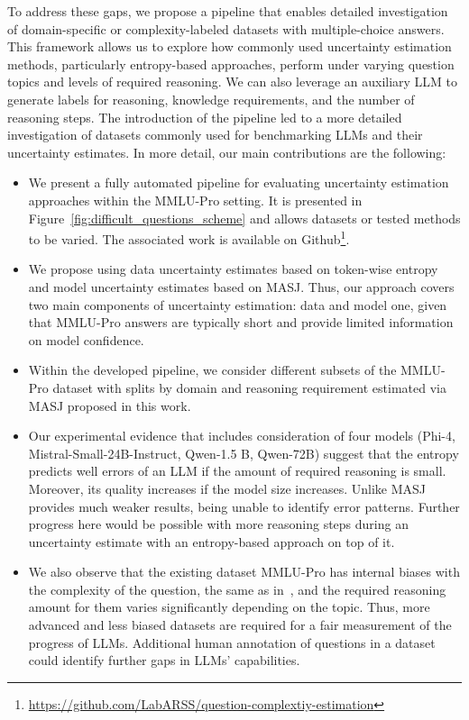 To address these gaps, we propose a pipeline that enables detailed investigation of domain-specific or complexity-labeled datasets with multiple-choice answers. 
This framework allows us to explore how commonly used uncertainty estimation methods, particularly entropy-based approaches, perform under varying question topics and levels of required reasoning. 
We can also leverage an auxiliary LLM to generate labels for reasoning, knowledge requirements, and the number of reasoning steps. 
The introduction of the pipeline led to a more detailed investigation of datasets commonly used for benchmarking LLMs and their uncertainty estimates.
In more detail, our main contributions are the following:
\begin{itemize}
    \item We present a fully automated pipeline for evaluating uncertainty estimation approaches within the MMLU-Pro setting. It is presented in Figure~\ref{fig:difficult_questions_scheme} and allows datasets or tested methods to be varied. The associated work is available on Github\footnote{\url{https://github.com/LabARSS/question-complextiy-estimation}}.
    \item We propose using data uncertainty estimates based on token-wise entropy and model uncertainty estimates based on MASJ. Thus, our approach covers two main components of uncertainty estimation: data and model one, given that MMLU-Pro answers are typically short and provide limited information on model confidence.
    \item Within the developed pipeline, we consider different subsets of the MMLU-Pro dataset with splits by domain and reasoning requirement estimated via MASJ proposed in this work.
    \item Our experimental evidence that includes consideration of four models (Phi-4, Mistral-Small-24B-Instruct, Qwen-1.5 B, Qwen-72B) suggest that the entropy predicts well errors of an LLM if the amount of required reasoning is small. Moreover, its quality increases if the model size increases. Unlike MASJ provides much weaker results, being unable to identify error patterns. Further progress here would be possible with more reasoning steps during an uncertainty estimate with an entropy-based approach on top of it.
    \item We also observe that the existing dataset MMLU-Pro has internal biases with the complexity of the question, the same as in~\cite{gema2025mmlu}, and the required reasoning amount for them varies significantly depending on the topic. Thus, more advanced and less biased datasets are required for a fair measurement of the progress of LLMs. Additional human annotation of questions in a dataset could identify further gaps in LLMs' capabilities.
\end{itemize}